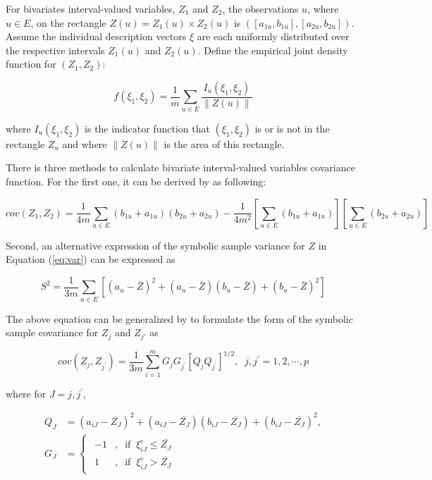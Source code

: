 \documentclass[article]{jss}
\begin{document}
For bivariates interval-valued variables, $Z_1$ and $Z_2$, the observations $u$, where $u \in E$, on the rectangle $Z(u) = Z_1(u) \times Z_2(u)$ is $([a_{1u}, b_{1u}], [a_{2u}, b_{2u}])$. Assume the individual description vectors $\xi$ are each uniformly distributed over the respective intervals $Z_1(u)$ and $Z_2(u)$.  Define the empirical joint density function for $(Z_1, Z_2)$:

\begin{equation}\label{eq:bi_density}
f(\xi_1,\xi_2)=\frac{1}{m}\sum_{u \in E}\frac{I_u(\xi_1,\xi_2)}{\| Z(u) \|}
\end{equation}

where $I_u(\xi_1,\xi_2)$ is the indicator function that $(\xi_1,\xi_2)$ is or is not in the rectangle $Z_u$ and where $\|Z(u)\|$ is the area of this rectangle.

There is three methods to calculate bivariate interval-valued variables covariance function. For the first one, it can be derived by \cite{billard:2003} as following:

\begin{equation}\label{eq:cov}
cov(Z_1,Z_2)=\frac{1}{4m}\sum_{u \in E}(b_{1u} + a_{1u})(b_{2u} + a_{2u})-\frac{1}{4m^2}\left[ \sum_{u \in E}(b_{1u} + a_{1u}) \right]\left[ \sum_{u \in E}(b_{2u} + a_{2u}) \right]
\end{equation}

Second, an alternative expression of the symbolic sample variance for $Z$ in Equation (\ref{eq:var}) can be expressed as

\[
S^2 = \frac{1}{3m}\sum_{u \in E}\left[  (a_u-\bar{Z})^2 +(a_u-\bar{Z})(b_u-\bar{Z})+(b_u-\bar{Z})^2 \right]
\]

The above equation can be generalized by \cite{Billard+Diday:2007} to formulate the form of the symbolic sample covariance for $Z_j$ and $Z_{j\prime}$ as

\begin{equation}\label{eq:gq_cov}
cov(Z_j,Z_{j^{ \prime}}) = \frac{1}{3m}\sum_{i=1}^{m}G_jG_{j^{\prime}}\left[ Q_jQ_{j^\prime} \right]^{1/2}, \;\;j,j^\prime=1,2,\cdots,p
\end{equation}

where for $J = j,j^\prime$, 

\[
\begin{split}
Q_J &= (a_{iJ} - \bar{Z_J})^2 +(a_{iJ} - \bar{Z_J})(b_{iJ} - \bar{Z_J})+(b_{iJ} - \bar{Z_J})^2,\\
G_J &= \left\{\begin{array}{l}
          \begin{split}
          -1 &, \;\;\mbox{if} \;\; \xi_{iJ}^{c} \leq \bar{Z_J}\\
           1 &,  \;\;\mbox{if} \;\;  \xi_{iJ}^{c} > \bar{Z_J}
           \end{split}
        \end{array}\right.
\end{split}
\]
\end{document}
